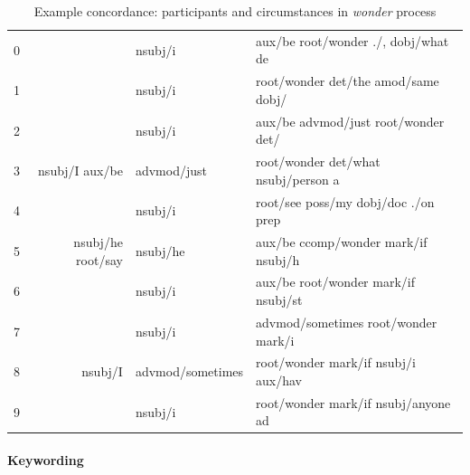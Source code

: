 
\begin{table}[H]
\footnotesize 
\ttfamily
\begin{tabular}{lrll}

\toprule
0 &                                    &  nsubj\slash i          &  aux\slash be root\slash wonder .\slash , dobj\slash what de \\
1 &                                    &  nsubj\slash i          &  root\slash wonder det\slash the amod\slash same dobj\slash  \\
2 &                                    &  nsubj\slash i          &  aux\slash be advmod\slash just root\slash wonder det\slash  \\
3 &                      nsubj\slash I aux\slash be &  advmod\slash just      &  root\slash wonder det\slash what nsubj\slash person a \\
4 &                                    &  nsubj\slash i          &  root\slash see poss\slash my dobj\slash doc .\slash on prep \\
5 &   nsubj\slash he root\slash say &  nsubj\slash he         &  aux\slash be ccomp\slash wonder mark\slash if nsubj\slash h \\
6 &                                    &  nsubj\slash i          &  aux\slash be root\slash wonder mark\slash if nsubj\slash st \\
7 &                                    &  nsubj\slash i          &  advmod\slash sometimes root\slash wonder mark\slash i \\
8 &                            nsubj\slash I &  advmod\slash sometimes &  root\slash wonder mark\slash if nsubj\slash i aux\slash hav \\
9 &                                    &  nsubj\slash i          &  root\slash wonder mark\slash if nsubj\slash anyone ad \\
\bottomrule
\end{tabular}
\caption[Example concordance]{Example concordance: participants and circumstances in \emph{wonder} process}
\label{conc:wonder_example}
\end{table}

\paragraph{Keywording}

